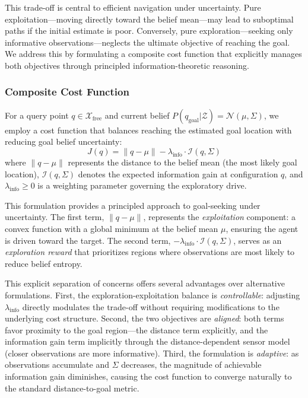 This trade-off is central to efficient navigation under uncertainty. Pure exploitation---moving directly toward the belief mean---may lead to suboptimal paths if the initial estimate is poor. Conversely, pure exploration---seeking only informative observations---neglects the ultimate objective of reaching the goal. We address this by formulating a composite cost function that explicitly manages both objectives through principled information-theoretic reasoning.

\subsubsection{Composite Cost Function}

For a query point $q \in \mathcal{X}_{\text{free}}$ and current belief $P(q_{\text{goal}} | \mathcal{Z}) = \mathcal{N}(\mu, \Sigma)$, we employ a cost function that balances reaching the estimated goal location with reducing goal belief uncertainty:
\begin{equation}
    J(q) = \|q - \mu\| - \lambda_{\text{info}} \cdot \mathcal{I}(q, \Sigma)
\end{equation}
where $\|q - \mu\|$ represents the distance to the belief mean (the most likely goal location), $\mathcal{I}(q, \Sigma)$ denotes the expected information gain at configuration $q$, and $\lambda_{\text{info}} \geq 0$ is a weighting parameter governing the exploratory drive.

This formulation provides a principled approach to goal-seeking under uncertainty. The first term, $\|q - \mu\|$, represents the \emph{exploitation} component: a convex function with a global minimum at the belief mean $\mu$, ensuring the agent is driven toward the target. The second term, $-\lambda_{\text{info}} \cdot \mathcal{I}(q, \Sigma)$, serves as an \emph{exploration reward} that prioritizes regions where observations are most likely to reduce belief entropy.

This explicit separation of concerns offers several advantages over alternative formulations. First, the exploration-exploitation balance is \emph{controllable}: adjusting $\lambda_{\text{info}}$ directly modulates the trade-off without requiring modifications to the underlying cost structure. Second, the two objectives are \emph{aligned}: both terms favor proximity to the goal region---the distance term explicitly, and the information gain term implicitly through the distance-dependent sensor model (closer observations are more informative). Third, the formulation is \emph{adaptive}: as observations accumulate and $\Sigma$ decreases, the magnitude of achievable information gain diminishes, causing the cost function to converge naturally to the standard distance-to-goal metric.

